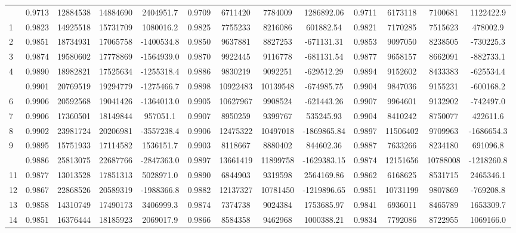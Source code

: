 \documentclass[
  12pt,
]{article}
\begin{document}
\begin{longtable}[t]{lcccccccccccc}
\endfoot
\bottomrule
\endlastfoot
0 & 0.9713 & 12884538 & 14884690 & 2404951.7 & 0.9709 & 6711420 & 7784009 & 1286892.06 & 0.9711 & 6173118 & 7100681 & 1122422.9\\
1 & 0.9823 & 14925518 & 15731709 & 1080016.2 & 0.9825 & 7755233 & 8216086 & 601882.54 & 0.9821 & 7170285 & 7515623 & 478002.9\\
2 & 0.9851 & 18734931 & 17065758 & -1400534.8 & 0.9850 & 9637881 & 8827253 & -671131.31 & 0.9853 & 9097050 & 8238505 & -730225.3\\
3 & 0.9874 & 19580602 & 17778869 & -1564939.0 & 0.9870 & 9922445 & 9116778 & -681131.54 & 0.9877 & 9658157 & 8662091 & -882733.1\\
4 & 0.9890 & 18982821 & 17525634 & -1255318.4 & 0.9886 & 9830219 & 9092251 & -629512.29 & 0.9894 & 9152602 & 8433383 & -625534.4\\
\addlinespace
5 & 0.9901 & 20769519 & 19294779 & -1275466.7 & 0.9898 & 10922483 & 10139548 & -674985.75 & 0.9904 & 9847036 & 9155231 & -600168.2\\
6 & 0.9906 & 20592568 & 19041426 & -1364013.0 & 0.9905 & 10627967 & 9908524 & -621443.26 & 0.9907 & 9964601 & 9132902 & -742497.0\\
7 & 0.9906 & 17360501 & 18149844 & 957051.1 & 0.9907 & 8950259 & 9399767 & 535245.93 & 0.9904 & 8410242 & 8750077 & 422611.6\\
8 & 0.9902 & 23981724 & 20206981 & -3557238.4 & 0.9906 & 12475322 & 10497018 & -1869865.84 & 0.9897 & 11506402 & 9709963 & -1686654.3\\
9 & 0.9895 & 15751933 & 17114582 & 1536151.7 & 0.9903 & 8118667 & 8880402 & 844602.36 & 0.9887 & 7633266 & 8234180 & 691096.8\\
\addlinespace
10 & 0.9886 & 25813075 & 22687766 & -2847363.0 & 0.9897 & 13661419 & 11899758 & -1629383.15 & 0.9874 & 12151656 & 10788008 & -1218260.8\\
11 & 0.9877 & 13013528 & 17851313 & 5028971.0 & 0.9890 & 6844903 & 9319598 & 2564169.86 & 0.9862 & 6168625 & 8531715 & 2465346.1\\
12 & 0.9867 & 22868526 & 20589319 & -1988366.8 & 0.9882 & 12137327 & 10781450 & -1219896.65 & 0.9851 & 10731199 & 9807869 & -769208.8\\
13 & 0.9858 & 14310749 & 17490173 & 3406999.3 & 0.9874 & 7374738 & 9024384 & 1753685.97 & 0.9841 & 6936011 & 8465789 & 1653309.7\\
14 & 0.9851 & 16376444 & 18185923 & 2069017.9 & 0.9866 & 8584358 & 9462968 & 1000388.21 & 0.9834 & 7792086 & 8722955 & 1069166.0\\

\end{longtable}
\end{document}
